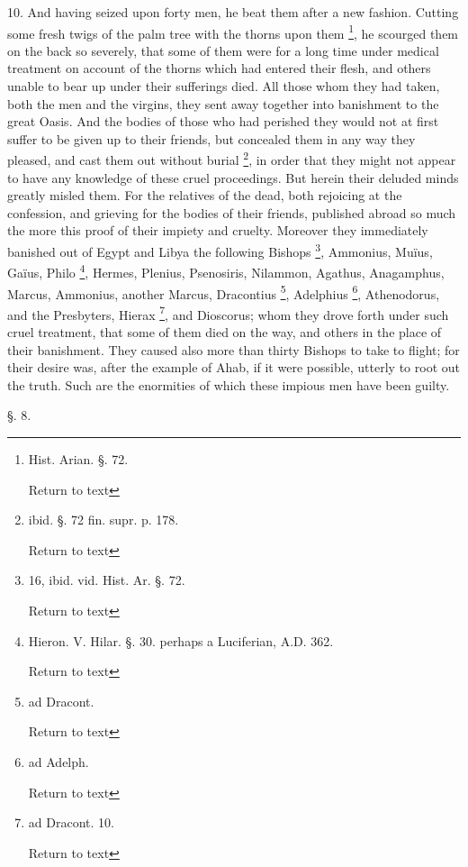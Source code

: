 10. And having seized upon forty men, he beat
them after a new fashion. Cutting some fresh twigs of the palm
tree with the thorns upon them \footnote{Hist. Arian. §. 72.

Return to text}, he scourged them on the back so severely, that some of them
were for a long time under medical treatment on account of the thorns
which had entered their flesh, and others unable to bear up under
their sufferings died. All those whom they had taken, both the men and
the virgins, they sent away together into banishment to the great
Oasis. And the bodies of those who had perished they would not at
first suffer to be given up to their friends, but concealed them in
any way they pleased, and cast them out without burial \footnote{ibid. §. 72 fin. supr. p. 178.

Return to text}, in order that they might not appear to have any knowledge of
these cruel proceedings. But herein their deluded minds greatly misled
them. For the relatives of the dead, both rejoicing at the confession,
and grieving for the bodies of their friends, published abroad so much
the more this proof of their impiety and cruelty. Moreover they
immediately banished out of Egypt and Libya the following Bishops \footnote{16, ibid. vid. Hist. Ar. §. 72.

Return to text}, Ammonius, Muïus, Gaïus, Philo \footnote{Hieron. V. Hilar. §. 30. perhaps a Luciferian, A.D.
362.

Return to text}, Hermes, Plenius, Psenosiris, Nilammon, Agathus, Anagamphus,
Marcus, Ammonius, another Marcus, Dracontius \footnote{ad Dracont.

Return to text}, Adelphius \footnote{ad Adelph.

Return to text},
Athenodorus, and the Presbyters, Hierax \footnote{ad Dracont. 10.

Return to text}, and Dioscorus; whom they drove forth under such cruel
treatment, that some of them died on the way, and others in the place
of their banishment. They caused also more than thirty Bishops to take
to flight; for their desire was, after the example of Ahab, if it were
possible, utterly to root out the truth. Such are the enormities of
which these impious men have been guilty.

§. 8.

